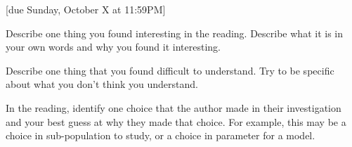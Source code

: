 \documentclass{article}
\begin{document}
[due Sunday, October X at 11:59PM]

\begin{probset}
\begin{prob}
    Describe one thing you found interesting in the reading. Describe what it is in your own words and why you found it interesting.

    \begin{soln}
        
    \end{soln}
\end{prob}

\begin{prob}
    Describe one thing that you found difficult to understand. Try to be specific about what you don't think you understand.

    \begin{soln}
        
    \end{soln}
\end{prob}

\begin{prob}
    In the reading, identify one choice that the author made in their investigation and your best guess at why they made that choice. For example, this may be a choice in sub-population to study, or a choice in parameter for a model.

    \begin{soln}
        
    \end{soln}
\end{prob}
\end{probset}
\end{document}

